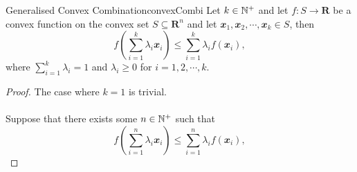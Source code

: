 \documentclass[math, code]{amznotes}
\theoremstyle{remark}
\begin{document}
\begin{probox}{Generalised Convex Combination}{convexCombi}
    Let $k \in \mathbb{N}^+$ and let $f \colon S \to \mathbf{R}$ be a convex function on the convex set $S \subseteq \mathbf{R}^n$ and let $\mathbfit{x}_1, \mathbfit{x}_2, \cdots, \mathbfit{x}_k \in S$, then 
    \begin{equation*}       
        f\left(\sum_{i = 1}^{k}\lambda_i\mathbfit{x}_i\right) \leq \sum_{i = 1}^{k}\lambda_i f(\mathbfit{x}_i),
    \end{equation*}     
    where $\sum_{i = 1}^{k}\lambda_i = 1$ and $\lambda_i \geq 0$ for $i = 1, 2, \cdots, k$.
    \tcblower
    \begin{proof}
        The case where $k = 1$ is trivial.
        \\\\
        Suppose that there exists some $n \in \mathbb{N}^+$ such that
        \begin{equation*}
            f\left(\sum_{i = 1}^{n}\lambda_i\mathbfit{x}_i\right) \leq \sum_{i = 1}^{n}\lambda_i f(\mathbfit{x}_i),
        \end{equation*}
    \end{proof}
\end{probox}
\end{document}

